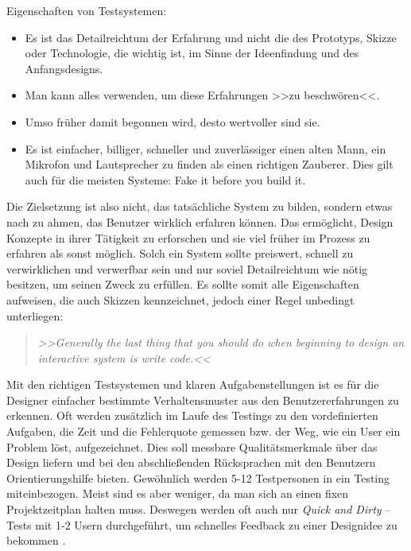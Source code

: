 \medskip Eigenschaften von Testsystemen:
\begin{itemize}
	\item Es ist das Detailreichtum der Erfahrung und nicht die des Prototyps, Skizze oder Technologie, die wichtig ist, im Sinne der Ideenfindung und des Anfangsdesigns.
	\item Man kann alles verwenden, um diese Erfahrungen >>zu beschwören<<.
	\item Umso früher damit begonnen wird, desto wertvoller sind sie.
	\item Es ist einfacher, billiger, schneller und zuverlässiger einen alten Mann, ein Mikrofon und Lautsprecher zu finden als einen richtigen Zauberer. Dies gilt auch für die meisten Systeme:  Fake it before you build it.
\end{itemize}
\begin{flushright}\citep{Buxton:2007}\end{flushright}
	
Die Zielsetzung ist also nicht, das tatsächliche System zu bilden, sondern etwas nach zu ahmen, das Benutzer wirklich erfahren können. Das ermöglicht, Design Konzepte in ihrer Tätigkeit zu erforschen und sie viel früher im Prozess zu erfahren als sonst möglich. Solch ein System sollte preiswert, schnell zu verwirklichen und verwerfbar sein und nur soviel Detailreichtum wie nötig besitzen, um seinen Zweck zu erfüllen. Es sollte somit alle Eigenschaften aufweisen, die auch Skizzen kennzeichnet, jedoch einer Regel unbedingt unterliegen: 

\begin{quote}
	\textsl{>>Generally the last thing that you should do when beginning to design an interactive system is write code.<<}
\begin{flushright}\citep{Buxton:2007}\end{flushright}
\end{quote}	

Mit den richtigen Testsystemen und klaren Aufgabenstellungen ist es für die Designer einfacher bestimmte Verhaltensmuster aus den Benutzererfahrungen zu erkennen. Oft werden zusätzlich im Laufe des Testings zu den vordefinierten Aufgaben, die Zeit und die Fehlerquote gemessen bzw. der Weg, wie ein User ein Problem löst, aufgezeichnet. Dies soll messbare Qualitätsmerkmale über das Design liefern und bei den abschließenden Rücksprachen mit den Benutzern Orientierungshilfe bieten.
Gewöhnlich werden 5-12 Testpersonen in ein Testing miteinbezogen. \citep{Dumas:1999} Meist sind es aber weniger, da man sich an einen fixen Projektzeitplan halten muss. Deswegen werden oft auch nur \emph{Quick and Dirty} – Tests mit 1-2 Usern durchgeführt, um schnelles Feedback zu einer Designidee zu bekommen \citep{Sharp:2002}.

